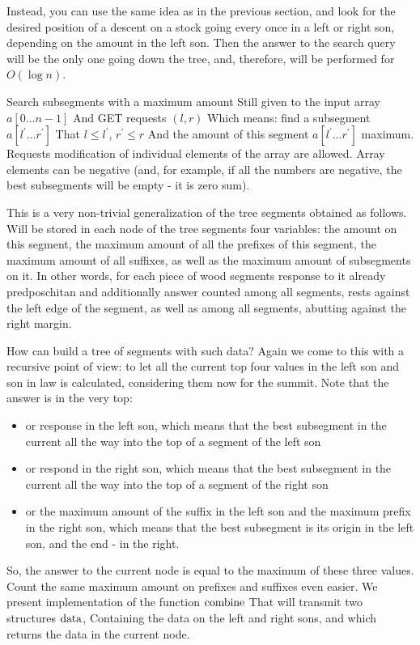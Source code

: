 Instead, you can use the same idea as in the previous section, and look for the desired position of a descent on a stock going every once in a left or right son, depending on the amount in the left son. Then the answer to the search query will be the only one going down the tree, and, therefore, will be performed for $O (\log n)$.

Search subsegments with a maximum amount
Still given to the input array $a [0 \ldots n-1]$ And GET requests $(l, r)$ Which means: find a subsegment $a [l ^ \prime \ldots r ^ \prime]$ That $l \le l ^ \prime$, $r ^ \prime \le r$ And the amount of this segment $a [l ^ \prime \ldots r ^ \prime]$ maximum. Requests modification of individual elements of the array are allowed. Array elements can be negative (and, for example, if all the numbers are negative, the best subsegments will be empty - it is zero sum).

This is a very non-trivial generalization of the tree segments obtained as follows. Will be stored in each node of the tree segments four variables: the amount on this segment, the maximum amount of all the prefixes of this segment, the maximum amount of all suffixes, as well as the maximum amount of subsegments on it. In other words, for each piece of wood segments response to it already predposchitan and additionally answer counted among all segments, rests against the left edge of the segment, as well as among all segments, abutting against the right margin.

How can build a tree of segments with such data? Again we come to this with a recursive point of view: to let all the current top four values ​​in the left son and son in law is calculated, considering them now for the summit. Note that the answer is in the very top:

\begin{itemize}
\item or response in the left son, which means that the best subsegment in the current all the way into the top of a segment of the left son
\item or respond in the right son, which means that the best subsegment in the current all the way into the top of a segment of the right son
\item or the maximum amount of the suffix in the left son and the maximum prefix in the right son, which means that the best subsegment is its origin in the left son, and the end - in the right.
\end{itemize}

So, the answer to the current node is equal to the maximum of these three values. Count the same maximum amount on prefixes and suffixes even easier. We present implementation of the function $\rm combine$ That will transmit two structures $\rm data$, Containing the data on the left and right sons, and which returns the data in the current node.

